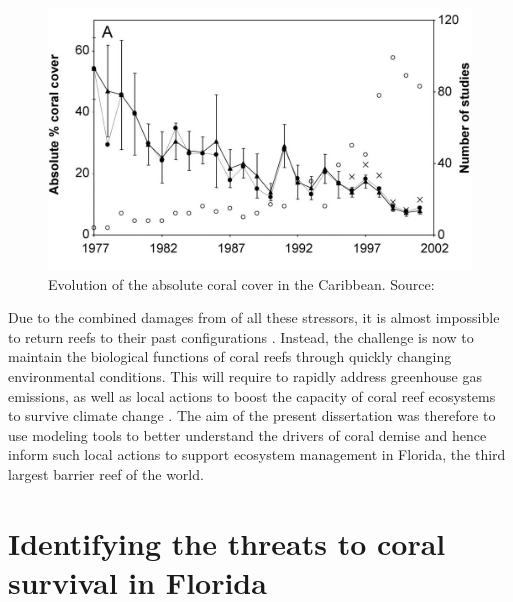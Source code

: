 \begin{figure}
    \centering
    \includegraphics[width=.9\textwidth]{chapters/intro/figures/cover.jpeg}
    \caption{Evolution of the absolute coral cover in the Caribbean. Source: \cite{gardner2003long}}
    \label{intro:cover}
\end{figure}

Due to the combined damages from of all these stressors, it is almost impossible to return reefs to their past configurations \citep{hughes2017coral}. Instead, the challenge is now to maintain the biological functions of coral reefs through quickly changing environmental conditions. This will require to rapidly address greenhouse gas emissions, as well as local actions to boost the capacity of coral reef ecosystems to survive climate change \citep{hughes2003climate,knowlton2008shifting,graham2015predicting,kleypas2021designing}. The aim of the present dissertation was therefore to use modeling tools to better understand the drivers of coral demise and hence inform such local actions to support ecosystem management in Florida, the third largest barrier reef of the world.

\section{Identifying the threats to coral survival in Florida}

